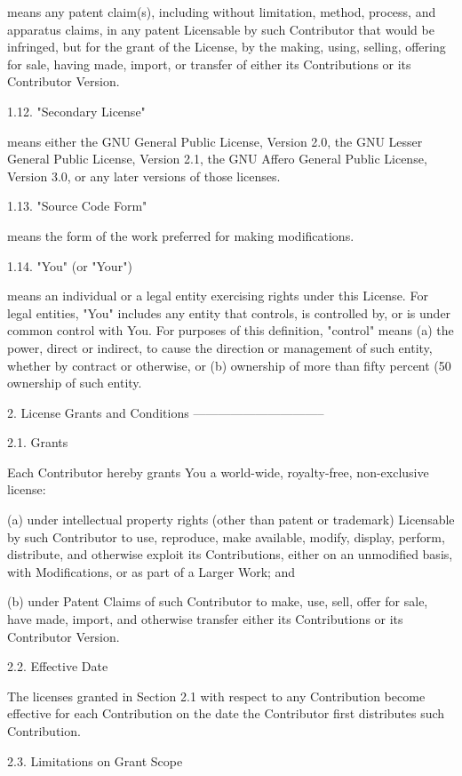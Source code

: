\begin{DoxyVerb}
 means any patent claim(s), including without limitation, method,
 process, and apparatus claims, in any patent Licensable by such
 Contributor that would be infringed, but for the grant of the
 License, by the making, using, selling, offering for sale, having
 made, import, or transfer of either its Contributions or its
 Contributor Version.

1.12. "Secondary License"

 means either the GNU General Public License, Version 2.0, the GNU
 Lesser General Public License, Version 2.1, the GNU Affero General
 Public License, Version 3.0, or any later versions of those
 licenses.

1.13. "Source Code Form"

 means the form of the work preferred for making modifications.

1.14. "You" (or "Your")

 means an individual or a legal entity exercising rights under this
 License. For legal entities, "You" includes any entity that
 controls, is controlled by, or is under common control with You. For
 purposes of this definition, "control" means (a) the power, direct
 or indirect, to cause the direction or management of such entity,
 whether by contract or otherwise, or (b) ownership of more than
 fifty percent (50%
 ownership of such entity.

2. License Grants and Conditions
--------------------------------

2.1. Grants

Each Contributor hereby grants You a world-wide, royalty-free,
non-exclusive license:

(a) under intellectual property rights (other than patent or trademark)
 Licensable by such Contributor to use, reproduce, make available,
 modify, display, perform, distribute, and otherwise exploit its
 Contributions, either on an unmodified basis, with Modifications, or
 as part of a Larger Work; and

(b) under Patent Claims of such Contributor to make, use, sell, offer
 for sale, have made, import, and otherwise transfer either its
 Contributions or its Contributor Version.

2.2. Effective Date

The licenses granted in Section 2.1 with respect to any Contribution
become effective for each Contribution on the date the Contributor first
distributes such Contribution.

2.3. Limitations on Grant Scope


\end{DoxyVerb}
